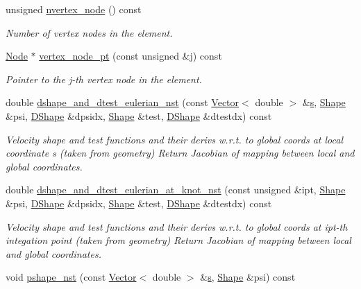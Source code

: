 \begin{DoxyCompactItemize}
unsigned \hyperlink{classoomph_1_1PRefineableQCrouzeixRaviartElement_a4f29431659c8fb00cd2b56b21bcb722c}{nvertex\+\_\+node} () const
\begin{DoxyCompactList}\small\item\em Number of vertex nodes in the element. \end{DoxyCompactList}\item 
\hyperlink{classoomph_1_1Node}{Node} $\ast$ \hyperlink{classoomph_1_1PRefineableQCrouzeixRaviartElement_a0a0d25592c0b9b04505fbd0b3bb4fb22}{vertex\+\_\+node\+\_\+pt} (const unsigned \&j) const
\begin{DoxyCompactList}\small\item\em Pointer to the j-\/th vertex node in the element. \end{DoxyCompactList}\item 
double \hyperlink{classoomph_1_1PRefineableQCrouzeixRaviartElement_a72a81749bb4c7f43462324935e1617a7}{dshape\+\_\+and\+\_\+dtest\+\_\+eulerian\+\_\+nst} (const \hyperlink{classoomph_1_1Vector}{Vector}$<$ double $>$ \&\hyperlink{cfortran_8h_ab7123126e4885ef647dd9c6e3807a21c}{s}, \hyperlink{classoomph_1_1Shape}{Shape} \&psi, \hyperlink{classoomph_1_1DShape}{D\+Shape} \&dpsidx, \hyperlink{classoomph_1_1Shape}{Shape} \&test, \hyperlink{classoomph_1_1DShape}{D\+Shape} \&dtestdx) const
\begin{DoxyCompactList}\small\item\em Velocity shape and test functions and their derivs w.\+r.\+t. to global coords at local coordinate s (taken from geometry) Return Jacobian of mapping between local and global coordinates. \end{DoxyCompactList}\item 
double \hyperlink{classoomph_1_1PRefineableQCrouzeixRaviartElement_ab11329961821573134dcc4d97b0b61f0}{dshape\+\_\+and\+\_\+dtest\+\_\+eulerian\+\_\+at\+\_\+knot\+\_\+nst} (const unsigned \&ipt, \hyperlink{classoomph_1_1Shape}{Shape} \&psi, \hyperlink{classoomph_1_1DShape}{D\+Shape} \&dpsidx, \hyperlink{classoomph_1_1Shape}{Shape} \&test, \hyperlink{classoomph_1_1DShape}{D\+Shape} \&dtestdx) const
\begin{DoxyCompactList}\small\item\em Velocity shape and test functions and their derivs w.\+r.\+t. to global coords at ipt-\/th integation point (taken from geometry) Return Jacobian of mapping between local and global coordinates. \end{DoxyCompactList}\item 
void \hyperlink{classoomph_1_1PRefineableQCrouzeixRaviartElement_a19222e5c997c7ce4a30452d9aab12ad0}{pshape\+\_\+nst} (const \hyperlink{classoomph_1_1Vector}{Vector}$<$ double $>$ \&\hyperlink{cfortran_8h_ab7123126e4885ef647dd9c6e3807a21c}{s}, \hyperlink{classoomph_1_1Shape}{Shape} \&psi) const

\end{DoxyCompactItemize}
